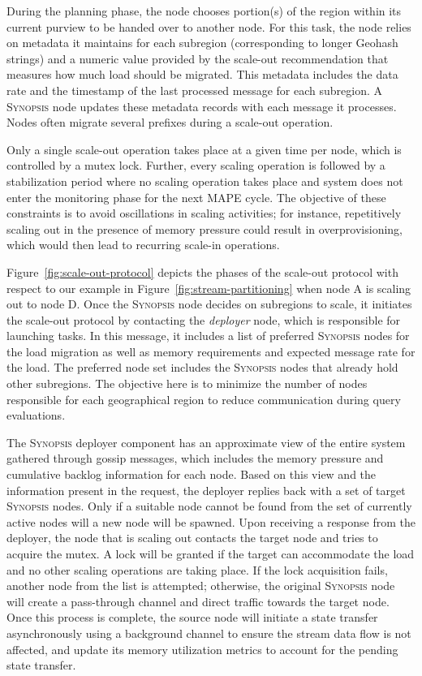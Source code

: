 During the planning phase, the node chooses portion(s) of the region within its current purview to be handed over to another node.
For this task, the node relies on metadata it maintains for each subregion (corresponding to longer Geohash strings) and a numeric value provided by the scale-out recommendation that measures how much load should be migrated.
This metadata includes the data rate and the timestamp of the last processed message for each subregion.
A \textsc{Synopsis} node updates these metadata records with each message it processes.
Nodes often migrate several prefixes during a scale-out operation.

Only a single scale-out operation takes place at a given time per node, which is controlled by a mutex lock.
Further, every scaling operation is followed by a stabilization period where no scaling operation takes place and system does not enter the monitoring phase for the next MAPE cycle.
The objective of these constraints is to avoid oscillations in scaling activities; for instance, repetitively scaling out in the presence of memory pressure could result in overprovisioning, which would then lead to recurring scale-in operations.
%

Figure~\ref{fig:scale-out-protocol} depicts the phases of the scale-out protocol with respect to our example in Figure~\ref{fig:stream-partitioning} when node A is scaling out to node D.
Once the \textsc{Synopsis} node decides on subregions to scale, it initiates the scale-out protocol by contacting the \emph{deployer} node, which is responsible for launching tasks.
In this message, it includes a list of preferred \textsc{Synopsis} nodes for the load migration as well as memory requirements and expected message rate for the load.
The preferred node set includes the \textsc{Synopsis} nodes that already hold other subregions.
The objective here is to minimize the number of nodes responsible for each geographical region to reduce communication during query evaluations.

The \textsc{Synopsis} deployer component has an approximate view of the entire system gathered through gossip messages, which includes the memory pressure and cumulative backlog information for each node.
Based on this view and the information present in the request, the deployer replies back with a set of target \textsc{Synopsis} nodes.
Only if a suitable node cannot be found from the set of currently active nodes will a new node will be spawned.
Upon receiving a response from the deployer, the node that is scaling out contacts the target node and tries to acquire the mutex.
A lock will be granted if the target can accommodate the load and no other scaling operations are taking place.
If the lock acquisition fails, another node from the list is attempted; otherwise, the original \textsc{Synopsis} node will create a pass-through channel and direct traffic towards the target node.
Once this process is complete, the source node will initiate a state transfer asynchronously using a background channel to ensure the stream data flow is not affected, and update its memory utilization metrics to account for the pending state transfer.

